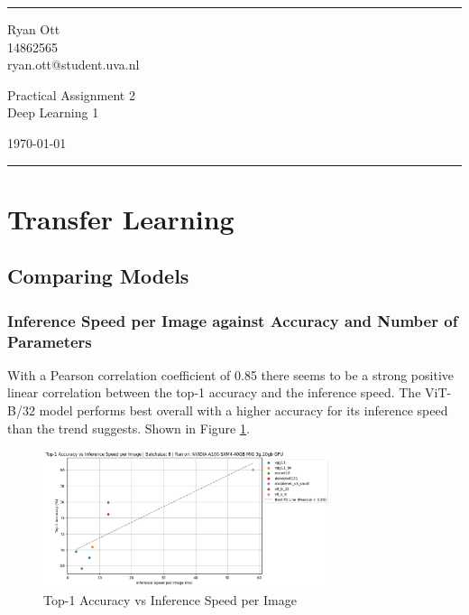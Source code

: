 \documentclass[a4paper]{article}
\begin{document}

\fancyhead[C]{}
\hrule \medskip %
\begin{minipage}{0.295\textwidth} 
\raggedright
\footnotesize
Ryan Ott \hfill\\   
14862565 \hfill\\
ryan.ott@student.uva.nl
\end{minipage}
\begin{minipage}{0.4\textwidth} 
\centering 
\large 
Practical Assignment 2\\ 
\normalsize 
Deep Learning 1\\ 
\end{minipage}
\begin{minipage}{0.295\textwidth} 
\raggedleft
\today\hfill\\
\end{minipage}
\medskip\hrule 
\bigskip


\section{Transfer Learning}
\subsection{Comparing Models}
\subsubsection{Inference Speed per Image against Accuracy and Number of Parameters}
With a Pearson correlation coefficient of 0.85 there seems to be a strong positive linear correlation between the
top-1 accuracy and the inference speed. The ViT-B/32 model performs best overall with a higher accuracy for its
inference speed than the trend suggests. Shown in Figure \ref{fig:Top1Acc-vs-Inference}.
\begin{figure}[h]
    \centering
    \includegraphics[width=0.75\textwidth]{"imgs/Top1Acc-vs-Inference.png"}
    \caption{Top-1 Accuracy vs Inference Speed per Image}
    \label{fig:Top1Acc-vs-Inference}
\end{figure}
\end{document}
